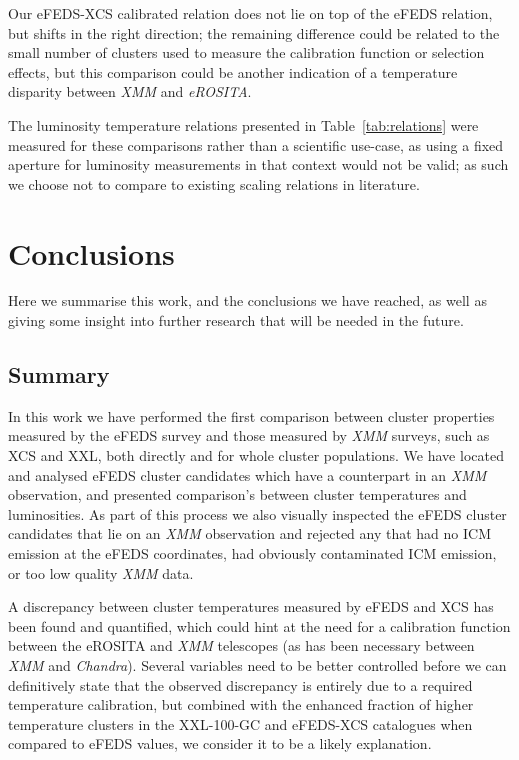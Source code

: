\documentclass[fleqn,usenatbib]{mnras}
\begin{document}
Our eFEDS-XCS calibrated relation does not lie on top of the eFEDS relation, but shifts in the right direction; the remaining difference could be related to the small number of clusters used to measure the calibration function or selection effects, but this comparison could be another indication of a temperature disparity between {\em XMM} and {\em eROSITA}.

The luminosity temperature relations presented in Table~\ref{tab:relations} were measured for these comparisons rather than a scientific use-case, as using a fixed aperture for luminosity measurements in that context would not be valid; as such we choose not to compare to existing scaling relations in literature.


\section{Conclusions}
\label{sec:conclusions}
Here we summarise this work, and the conclusions we have reached, as well as giving some insight into further research that will be needed in the future.

\subsection{Summary}
In this work we have performed the first comparison between cluster properties measured by the eFEDS survey and those measured by {\em XMM} surveys, such as XCS and XXL, both directly and for whole cluster populations. We have located and analysed eFEDS cluster candidates which have a counterpart in an {\em XMM} observation, and presented comparison's between cluster temperatures and luminosities. As part of this process we also visually inspected the eFEDS cluster candidates that lie on an {\em XMM} observation and rejected any that had no ICM emission at the eFEDS coordinates, had obviously contaminated ICM emission, or too low quality {\em XMM} data.

A discrepancy between cluster temperatures measured by eFEDS and XCS has been found and quantified, which could hint at the need for a calibration function between the eROSITA and {\em XMM} telescopes (as has been necessary between {\em XMM} and {\em Chandra}). Several variables need to be better controlled before we can definitively state that the observed discrepancy is entirely due to a required temperature calibration, but combined with the enhanced fraction of higher temperature clusters in the XXL-100-GC and eFEDS-XCS catalogues when compared to eFEDS values, we consider it to be a likely explanation. 
 
\end{document}
